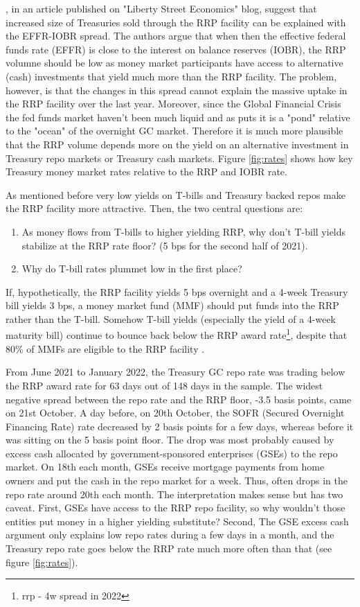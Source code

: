 \documentclass[11pt,a4paper,english,oneside]{article}
\begin{document}
\citet{alfonso2022}, in an article published on "Liberty Street Economics" blog, suggest that increased size of Treasuries sold through the RRP facility can be explained with the EFFR-IOBR spread. The authors argue that when then the effective federal funds rate (EFFR) is close to the interest on balance reserves (IOBR), the RRP volumne should be low as money market participants have access to alternative (cash) investments that yield much more than the RRP facility. The problem, however, is that the changes in this spread cannot explain the massive uptake in the RRP facility over the last year. Moreover, since the Global Financial Crisis the fed funds market haven't been much liquid and as \citet{gmn22} puts it is a "pond" relative to the "ocean" of the overnight GC market. Therefore it is much more plausible that the RRP volume depends more on the yield on an alternative investment in Treasury repo markets or Treasury cash markets. Figure \ref{fig:rates} shows how key Treasury money market rates relative to the RRP and IOBR rate.

As mentioned before very low yields on T-bills and Treasury backed repos make the RRP facility more attractive. Then, the two central questions are:
\begin{enumerate}
  \item As money flows from T-bills to higher yielding RRP, why don't T-bill yields stabilize at the RRP rate floor? (5 bps for the second half of 2021).
  \item Why do T-bill rates plummet low in the first place?
\end{enumerate}

If, hypothetically, the RRP facility yields 5 bps overnight and a 4-week Treasury bill yields 3 bps, a money market fund (MMF) should put funds into the RRP rather than the T-bill. Somehow T-bill yields (especially the yield of a 4-week maturity bill) continue to bounce back below the RRP award rate\footnote{rrp - 4w spread in 2022}, despite that 80\% of MMFs are eligible to the RRP facility \citet{cipriani2022}.

From June 2021 to January 2022, the Treasury GC repo rate was trading below the RRP award rate for 63 days out of 148 days in the sample. The widest negative spread between the repo rate and the RRP floor, -3.5 basis points, came on 21st October. A day before, on 20th October, the SOFR (Secured Overnight Financing Rate) rate decreased by 2 basis points for a few days, whereas before it was sitting on the 5 basis point floor. The drop was most probably caused by excess cash allocated by government-sponsored enterprises (GSEs) to the repo market. On 18th each month, GSEs receive mortgage payments from home owners and put the cash in the repo market for a week\citet{reuters2021}. Thus, often drops in the repo rate around 20th each month. The interpretation makes sense but has two caveat. First, GSEs have access to the RRP repo facility, so why wouldn't those entities put money in a higher yielding substitute? Second, The GSE excess cash argument only explains low repo rates during a few days in a month, and the Treasury repo rate goes below the RRP rate much more often than that (see figure \ref{fig:rates}).
\end{document}
